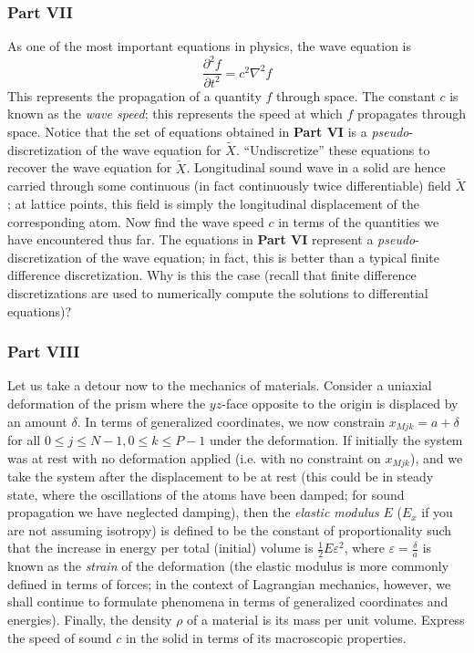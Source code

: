 \documentclass[letterpaper,12pt]{article}
\newcommand*{\npderiv}[3]{\frac{\partial^{#3} #1}{\partial #2^{#3}}}
\begin{document}
\begin{flushleft}
    \subsubsection*{Part VII}
    As one of the most important equations in physics, the wave equation is
    $$\npderiv{f}{t}{2} = c^2 \nabla^2 f$$
    This represents the propagation of a quantity $f$ through space. The constant $c$ is known as the \textit{wave speed}; this represents the speed at which $f$ propagates through space. Notice that the set of equations obtained in \textbf{Part VI} is a \textit{pseudo}-discretization of the wave equation for $\tilde{X}$. \newline\newline
    ``Undiscretize'' these equations to recover the wave equation for $\tilde{X}$. Longitudinal sound wave in a solid are hence carried through some continuous (in fact continuously twice differentiable) field $\tilde{X}$; at lattice points, this field is simply the longitudinal displacement of the corresponding atom. Now find the wave speed $c$ in terms of the quantities we have encountered thus far. The equations in \textbf{Part VI} represent a \textit{pseudo}-discretization of the wave equation; in fact, this is better than a typical finite difference discretization. Why is this the case (recall that finite difference discretizations are used to numerically compute the solutions to differential equations)?

    \subsubsection*{Part VIII}
    Let us take a detour now to the mechanics of materials. Consider a uniaxial deformation of the prism where the $yz$-face opposite to the origin is displaced by an amount $\delta$. In terms of generalized coordinates, we now constrain $x_{Mjk} = a + \delta$ for all $0 \leq j \leq N-1, 0 \leq k \leq P-1$ under the deformation. If initially the system was at rest with no deformation applied (i.e. with no constraint on $x_{Mjk}$), and we take the system after the displacement to be at rest (this could be in steady state, where the oscillations of the atoms have been damped; for sound propagation we have neglected damping), then the \textit{elastic modulus} $E$ ($E_x$ if you are not assuming isotropy) is defined to be the constant of proportionality such that the increase in energy per total (initial) volume is $\frac{1}{2}E\varepsilon^2$, where $\varepsilon = \frac{\delta}{a}$ is known as the \textit{strain} of the deformation (the elastic modulus is more commonly defined in terms of forces; in the context of Lagrangian mechanics, however, we shall continue to formulate phenomena in terms of generalized coordinates and energies). Finally, the density $\rho$ of a material is its mass per unit volume.\newline\newline
    Express the speed of sound $c$ in the solid in terms of its macroscopic properties.


\end{flushleft}
\end{document}
